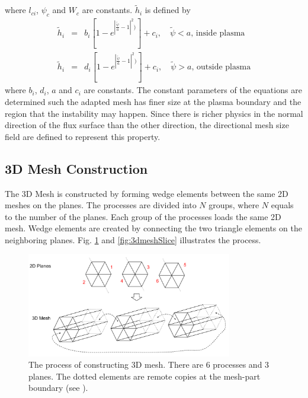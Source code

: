 \documentclass[11pt]{article}  %
\begin{document}
where $l_{ci}$, $\psi_c$ and $W_c$ are constants. 
$\tilde{h}_i$ is defined by
\begin{eqnarray}
\tilde{h}_i&=&b_i[1-e^{|\frac{\tilde{\psi}}{a}-1|^2)}]+c_i, \quad \tilde{\psi}<a,\, \text{inside plasma} \nonumber \\ 
\tilde{h}_i&=&d_i[1-e^{|\frac{\tilde{\psi}}{a}-1|^2)}]+c_i, \quad \tilde{\psi}>a, \, \text{outside plasma}
\end{eqnarray}
where $b_i$, $d_i$, $a$ and $c_i$ are constants. The constant parameters of the equations are determined such the adapted mesh has finer size at the plasma boundary and the region that the instability may happen. Since there is richer physics in the normal direction of the flux surface than the other direction, the directional mesh size field are defined to represent this property.
\subsection{3D Mesh Construction}
The 3D Mesh is constructed by forming wedge elements between the same 2D meshes on the planes. The processes are divided into $N$ groups, where $N$ equals to the number of the planes. Each group of the processes loads the same 2D mesh. Wedge elements are created by connecting the two triangle elements on the neighboring planes.  Fig. \ref{fig:3dmesh} and \ref{fig:3dmeshSlice} illustrates the process.

\begin{figure}[htb]
\center
\includegraphics[width=0.8\textwidth]{fig/3dmesh.png}
\caption{The process of constructing 3D mesh. There are 6 processes and 3 planes. The dotted elements are remote copies at the mesh-part boundary (see \cite{pumi-web-page}).} \label{fig:3dmesh}
\end{figure}
\end{document}
